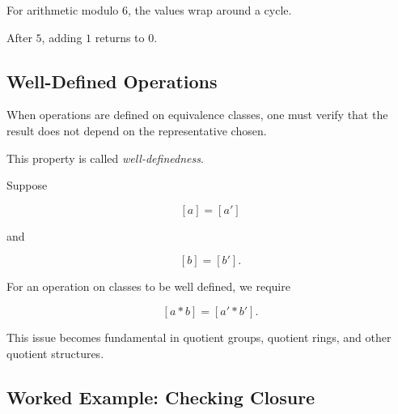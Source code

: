 For arithmetic modulo \(6\), the values wrap around a cycle.

\begin{center}
\end{center}

After \(5\), adding \(1\) returns to \(0\).

\subsection{Well-Defined Operations}
\label{subsec:well-defined-operations}

When operations are defined on equivalence classes, one must verify that the
result does not depend on the representative chosen.

This property is called \emph{well-definedness}.

Suppose

\[ [a]=[a'] \]

and

\[ [b]=[b']. \]

For an operation on classes to be well defined, we require

\[ [a*b]=[a'*b']. \]

This issue becomes fundamental in quotient groups, quotient rings, and other
quotient structures.

\subsection{Worked Example: Checking Closure}
\label{subsec:worked-checking-closure}


